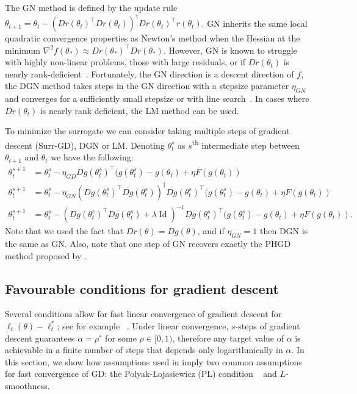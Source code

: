 \documentclass{article} %
\theoremstyle{definition}
\newcommand{\id}{\operatorname{Id}}
\begin{document}
The GN method is defined by the update rule $\theta_{t+1} = \theta_t - (Dr(\theta_t)^\top Dr(\theta_t))^\dag Dr(\theta_t)^\top r(\theta_t)$. 
GN inherits the same local quadratic convergence properties as Newton's method
when the Hessian at the minimum $\nabla^2 f(\theta_\ast) \approx Dr(\theta_\ast)^\top Dr(\theta_\ast)$. 
However, GN is known to struggle with highly non-linear problems, those with large residuals, or if $Dr(\theta_t)$ is nearly rank-deficient~\citep{bjorck1996numerical}.
Fortunately, the GN direction is a descent direction of $f$, the DGN method takes steps in the GN direction with a stepsize parameter $\eta_{GN}$ and converges for a sufficiently small stepsize or with line search~\citep{bjorck1996numerical}.
In cases where $Dr(\theta_t)$ is nearly rank deficient, the LM method can be used. 

To minimize the surrogate we can consider taking multiple steps of gradient descent (Surr-GD), DGN or LM. 
Denoting $\theta_t^s$ as $s$\textsuperscript{th} intermediate step between $\theta_{t+1}$ and $\theta_t$ we have the following:
\begin{align}
        \tag{Surr-GD} \theta_t^{s+1} &= \theta_t^s - \eta_{GD} Dg(\theta_t^s)^\top (g(\theta_t^s)-g(\theta_t)+\eta F(g(\theta_t))\\
    \tag{DGN}\label{eq:DGN} \theta_t^{s+1} &= \theta_t^s - \eta_{GN} (Dg(\theta_t^s)^\top Dg(\theta_t^s))^{\dag} Dg(\theta_t^s)^\top (g(\theta_t^s)-g(\theta_t)+\eta F(g(\theta_t))\\
    \tag{LM} \theta_t^{s+1} &= \theta_t^s - (Dg(\theta_t^s)^\top Dg(\theta_t^s) +\lambda \id)^{-1} Dg(\theta_t^s)^\top (g(\theta_t^s)-g(\theta_t)+\eta F(g(\theta_t)).
\end{align}
Note that we used the fact that $Dr(\theta) = Dg(\theta)$, and if $\eta_{GN}=1$ then DGN is the same as GN.
Also, note that one step of GN recovers exactly the PHGD method proposed by \citet{sakos2024exploiting}.

\subsection{Favourable conditions for gradient descent}\label{sec:gd-gn}

Several conditions allow for fast linear convergence of gradient descent for $\ell_t(\theta) - \ell_t^\ast$; see for example ~\citet{guille-escuret21a}.
Under linear convergence, $s$-steps of gradient descent guarantees $\alpha = \rho^s$ for some $\rho \in [0,1)$, therefore any target value of $\alpha$ is achievable in a finite number of steps that depends only logarithmically in $\alpha$.
In this section, we show how assumptions used in \citet{sakos2024exploiting} imply two common assumptions for fast convergence of GD: the Polyak-\L{}ojasiewicz (PL) condition ~\citep[Definition  \ref{def:pl}]{polyak1964gradient,lojasiewicz1963propriete} and $L$-smoothness.
\end{document}
